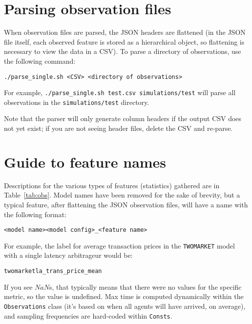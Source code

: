 \documentclass[11pt]{article}
\begin{document}
\section{Parsing observation files}

When observation files are parsed, the JSON headers are flattened (in the JSON file itself, each observed feature is stored as a hierarchical object, so flattening is necessary to view the data in a CSV).
%
To parse a directory of observations, use the following command:
\begin{verbatim}
./parse_single.sh <CSV> <directory of observations>
\end{verbatim}
For example, \verb|./parse_single.sh test.csv simulations/test| will parse all observations in the \verb|simulations/test| directory.

Note that the parser will only generate column headers if the output CSV does not yet exist; if you are not seeing header files, delete the CSV and re-parse.

\section{Guide to feature names}

Descriptions for the various types of features (statistics) gathered are in Table~\ref{tab:obs}.
Model names have been removed for the sake of brevity, but a typical feature, after flattening the JSON observation files, will have a name with the following format: \begin{verbatim}<model name><model config>_<feature name>\end{verbatim}
%
For example, the label for average transaction prices in the \verb|TWOMARKET| model with a single latency arbitrageur would be:
\begin{verbatim}twomarketla_trans_price_mean\end{verbatim}

If you see $NaN$s, that typically means that there were no values for the specific metric, so the value is undefined. Max time is computed dynamically within the \verb|Observations| class (it's based on when all agents will have arrived, on average), and sampling frequencies are hard-coded within \verb|Consts|.
\end{document}
